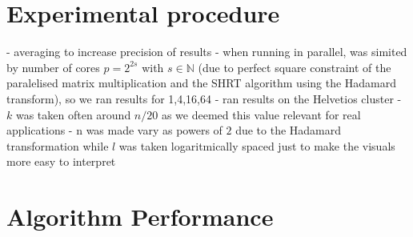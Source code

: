 \documentclass[a4paper, 12pt,oneside]{article}
\begin{document}
	\section{Experimental procedure}
		- averaging to increase precision of results
		- when running in parallel, was simited by number of cores $p=2^{2s}$ with $s\in\mathbb{N}$ (due to perfect square constraint of the paralelised matrix multiplication and the SHRT algorithm using the Hadamard transform), so we ran results for 1,4,16,64
		- ran results on the Helvetios cluster 
		- $k$ was taken often around $n/20$ as we deemed this value relevant for real applications
		- n was made vary as powers of $2$ due to the Hadamard transformation while $l$ was taken logaritmically spaced just to make the visuals more easy to interpret  
	\section{Algorithm Performance}
\end{document}
